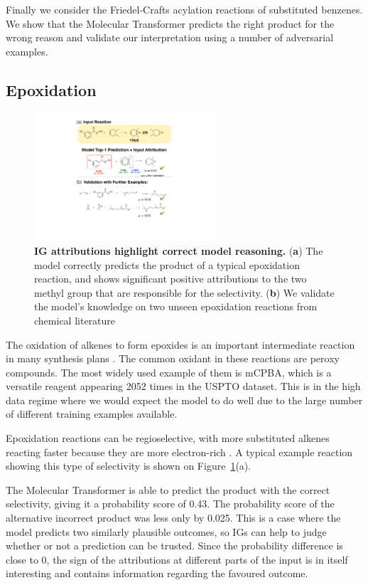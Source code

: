 Finally we consider the Friedel-Crafts acylation reactions of substituted benzenes. We show that the Molecular Transformer predicts the right product for the wrong reason and validate our interpretation using a number of adversarial examples.

\subsection{Epoxidation}

\begin{figure}[ht!]
    \centering
    \includegraphics[width=0.6\textwidth]{Chapters/Transformer/Figs/epoxidation.pdf}
    \caption{\label{fig:epoxide} \textbf{IG attributions highlight correct model reasoning.} (\textbf{a}) The model correctly predicts the product of a typical epoxidation reaction, and shows significant positive attributions to the two methyl group that are responsible for the selectivity. (\textbf{b}) We validate the model's knowledge on two unseen epoxidation reactions from chemical literature~\cite{Lluch1993}}
\end{figure}

The oxidation of alkenes to form epoxides is an important intermediate reaction in many synthesis plans \cite{Clayden2012}. The common oxidant in these reactions are peroxy compounds. The most widely used example of them is mCPBA, which is a versatile reagent appearing 2052 times in the USPTO dataset. This is in the high data regime where we would expect the model to do well due to the large number of different training examples available. 

Epoxidation reactions can be regioselective, with more substituted alkenes reacting faster because they are more electron-rich \cite{Clayden2012}. A typical example reaction showing this type of selectivity is shown on Figure~\ref{fig:epoxide}(a). 

The Molecular Transformer is able to predict the product with the correct selectivity, giving it a probability score of 0.43. The probability score of the alternative incorrect product was less only by 0.025. This is a case where the model predicts two similarly plausible outcomes, so IGs can help to judge whether or not a prediction can be trusted. Since the probability difference is close to 0, the sign of the attributions at different parts of the input is in itself interesting and contains information regarding the favoured outcome. 


